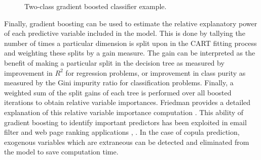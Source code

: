 \begin{figure}[H]%
    \centering
    \hspace*{-1.0em}%
    \caption{Two-class gradient boosted classifier example.}%
    \label{fig:gb3}%
\end{figure}

Finally, gradient boosting can be used to estimate the relative explanatory power of each predictive variable included in the model.  This is done by tallying the number of times a particular dimension is split upon in the CART fitting process and weighting these splits by a gain measure.  The gain can be interpreted as the benefit of making a particular split in the decision tree as measured by improvement in $R^2$ for regression problems, or improvement in class purity as measured by the Gini impurity ratio for classification problems.  Finally, a weighted sum of the split gains of each tree is performed over all boosted iterations to obtain relative variable importances. Friedman provides a detailed explanation of this relative variable importance computation \cite{friedman2001}.  This ability of gradient boosting to identify important predictors has been exploited in email filter and web page ranking applications \cite{chapelle2011}, \cite{Tyree2011}.  In the case of copula prediction, exogenous variables which are extraneous can be detected and eliminated from the model to save computation time.  
